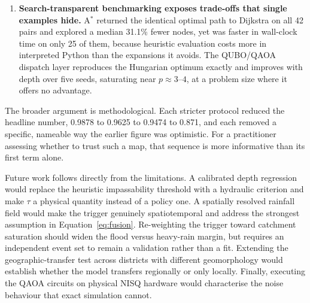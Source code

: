 \documentclass[11pt,a4paper]{article}
\begin{document}
\begin{enumerate}
      pairs at $\tau\ge0.65$, $0.55$--$0.60$ and $\le0.50$. $\tau$ should be set
      by policy on acceptable risk, not by convention.
\item \textbf{Search-transparent benchmarking exposes trade-offs that single
      examples hide.} A$^\ast$ returned the identical optimal path to Dijkstra on
      all 42 pairs and explored a median 31.1\% fewer nodes, yet was faster in
      wall-clock time on only 25 of them, because heuristic evaluation costs more
      in interpreted Python than the expansions it avoids. The QUBO/QAOA dispatch
      layer reproduces the Hungarian optimum exactly and improves with depth
      over five seeds, saturating near $p\approx3$--$4$, at a problem size where
      it offers no advantage.
\end{enumerate}

The broader argument is methodological. Each stricter protocol reduced the
headline number, 0.9878 to 0.9625 to 0.9474 to 0.871, and each removed a specific,
nameable way the earlier figure was optimistic. For a practitioner assessing
whether to trust such a map, that sequence is more informative than its first term
alone.

Future work follows directly from the limitations. A calibrated depth regression
would replace the heuristic impassability threshold with a hydraulic criterion
and make $\tau$ a physical quantity instead of a policy one. A spatially
resolved rainfall field would make the trigger genuinely spatiotemporal and
address the strongest assumption in Equation~\eqref{eq:fusion}. Re-weighting the
trigger toward catchment saturation should widen the flood versus heavy-rain
margin, but requires an independent event set to remain a validation rather than
a fit. Extending the geographic-transfer test across districts with different
geomorphology would establish whether the model transfers regionally or only
locally. Finally, executing the QAOA circuits on physical NISQ hardware would
characterise the noise behaviour that exact simulation cannot.
\end{document}
